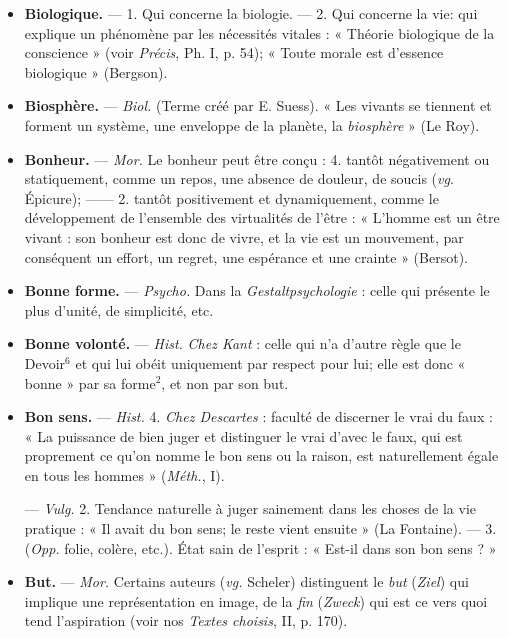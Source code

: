 \begin{itemize}[leftmargin=1cm, label=, itemsep=1pt]
\item {\bf Biologique.} — 1. Qui concerne la
biologie. — 2. Qui concerne la vie:
qui explique un phénomène par les
nécessités vitales : « Théorie biologique
de la conscience » (voir {\it Précis},
Ph. I, p. 54); « Toute morale est
d'essence biologique » (Bergson).

\item {\bf Biosphère.} — \textsf{\textit {Biol.}} (Terme créé par
E. Suess). « Les vivants se tiennent
et forment un système, une enveloppe de la planète, la {\it biosphère} »
(Le Roy).

\item {\bf Bonheur.} — \textsf{\textit {Mor.}} Le bonheur peut
être conçu : 4. tantôt négativement
ou statiquement, comme un repos,
une absence de douleur, de soucis
({\it vg}. Épicure); —— 2. tantôt positivement et dynamiquement, comme le
développement de l’ensemble des
virtualités de l'être : « L'homme est
un être vivant : son bonheur est
donc de vivre, et la vie est un mouvement, par conséquent un effort,
un regret, une espérance et une
crainte » (Bersot).

\item {\bf Bonne forme.} — \textsf{\textit {Psycho.}} Dans la
{\it Gestaltpsychologie} : celle qui présente
le plus d'unité, de simplicité, etc.

\item {\bf Bonne volonté.} — \textsf{\textit {Hist.}} {\it Chez Kant} :
celle qui n’a d'autre règle que le
Devoir$^6$ et qui lui obéit uniquement
par respect pour lui; elle est donc
« bonne » par sa forme$^2$, et non par
son but.

\item {\bf Bon sens.} — \textsf{\textit {Hist.}} 4. {\it Chez Descartes} :
faculté de discerner le vrai du faux :
« La puissance de bien juger et distinguer le vrai d'avec le faux, qui
est proprement ce qu'on nomme le
bon sens ou la raison, est naturellement égale en tous les hommes »
({\it Méth.}, I).

— \textsf{\textit {Vulg.}} 2. Tendance naturelle à
juger sainement dans les choses de
la vie pratique : « Il avait du bon
sens; le reste vient ensuite » (La
Fontaine). — 3. ({\it Opp.} folie, colère,
etc.). État sain de l'esprit : « Est-il
dans son bon sens ? »

\item {\bf But.} — \textsf{\textit {Mor.}} Certains auteurs ({\it vg.}
Scheler) distinguent le {\it but} ({\it Ziel}) qui
implique une représentation en
image, de la {\it fin} ({\it Zweck}) qui est ce
vers quoi tend l'aspiration (voir nos
{\it Textes choisis}, II, p. 170).

	\end{itemize}
